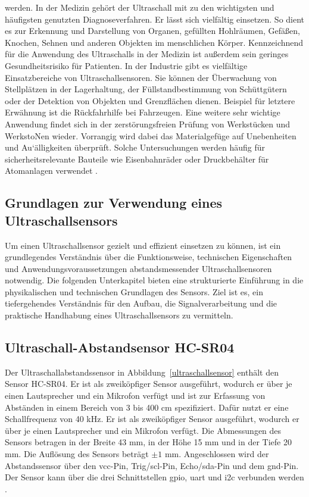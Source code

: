 werden.
In der Medizin gehört der Ultraschall mit zu den wichtigsten und häufigsten genutzten
Diagnoseverfahren. Er lässt sich vielfältig einsetzen. So dient es zur Erkennung und
Darstellung von Organen, gefüllten Hohlräumen, Gefäßen, Knochen, Sehnen und
anderen Objekten im menschlichen Körper. Kennzeichnend für die Anwendung des
Ultraschalls in der Medizin ist außerdem sein geringes Gesundheitsrisiko für Patienten.
In der Industrie gibt es vielfältige Einsatzbereiche von Ultraschallsensoren. Sie können
der Überwachung von Stellplätzen in der Lagerhaltung, der Füllstandbestimmung von
Schüttgütern \cite{Hesse:2009} oder der Detektion von Objekten und Grenzflächen dienen. Beispiel für letztere Erwähnung ist die Rückfahrhilfe bei Fahrzeugen. Eine weitere sehr wichtige
Anwendung findet sich in der zerstörungsfreien Prüfung von Werkstücken und
WerkstoNen wieder. Vorrangig wird dabei das Materialgefüge auf Unebenheiten und
Au`älligkeiten überprüft. Solche Untersuchungen werden häufig für
sicherheitsrelevante Bauteile wie Eisenbahnräder oder Druckbehälter für Atomanlagen
verwendet \cite{Muller:2017}.

\subsection{Grundlagen zur Verwendung eines Ultraschallsensors}
Um einen Ultraschallsensor gezielt und effizient einsetzen zu können, ist ein
grundlegendes Verständnis über die Funktionsweise, technischen Eigenschaften und
Anwendungsvoraussetzungen abstandsmessender Ultraschallsensoren notwendig. Die
folgenden Unterkapitel bieten eine strukturierte Einführung in die physikalischen und
technischen Grundlagen des Sensors. Ziel ist es, ein tiefergehendes Verständnis für den
Aufbau, die Signalverarbeitung und die praktische Handhabung eines Ultraschallsensors zu
vermitteln. \cite{Arduino:2024}

\subsection{Ultraschall-Abstandsensor HC-SR04}

Der Ultraschallabstandssensor in Abbildung~\ref{ultraschallsensor} enthält den Sensor HC-SR04. Er ist als zweiköpfiger Sensor ausgeführt, wodurch er über je einen Lautsprecher und ein Mikrofon verfügt und ist  zur Erfassung von Abständen in einem Bereich von 3 bis 400 cm spezifiziert. Dafür nutzt er eine Schallfrequenz von 40 kHz. Er ist als zweiköpfiger Sensor ausgeführt, wodurch er über je einen Lautsprecher und ein Mikrofon verfügt.  Die Abmessungen des Sensors betragen in der Breite 43 mm, in der Höhe 15 mm und in der Tiefe 20 mm. Die Auflösung des Sensors beträgt $\pm 1$ mm. Angeschlossen wird der Abstandssensor über den \ac{vcc}-Pin, Trig/\ac{scl}-Pin, Echo/\ac{sda}-Pin und dem \ac{gnd}-Pin. Der Sensor kann über die drei Schnittstellen \ac{gpio}, \ac{uart} und \ac{i2c} verbunden werden \cite{Simac:2017}. 


